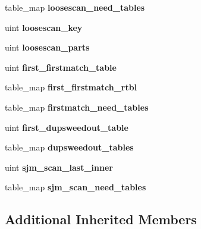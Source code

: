 \begin{DoxyCompactItemize}
\mbox{\label{structst__position_a8cd3ebf9fc563bfac1983f97a97bc81f}} 
table\+\_\+map {\bfseries loosescan\+\_\+need\+\_\+tables}
\item 
\mbox{\label{structst__position_a0f7959094b0551189f17496b4318dfad}} 
uint {\bfseries loosescan\+\_\+key}
\item 
\mbox{\label{structst__position_ac53c4c03bf2a7962e65bcfd0c1d549db}} 
uint {\bfseries loosescan\+\_\+parts}
\item 
\mbox{\label{structst__position_aa2143e25acde96767b338afe1b71f665}} 
uint {\bfseries first\+\_\+firstmatch\+\_\+table}
\item 
\mbox{\label{structst__position_a2250a6e56fb9822a536464bca7120009}} 
table\+\_\+map {\bfseries first\+\_\+firstmatch\+\_\+rtbl}
\item 
\mbox{\label{structst__position_aa2e6ad52f286351f2d69b0d1fbe617a9}} 
table\+\_\+map {\bfseries firstmatch\+\_\+need\+\_\+tables}
\item 
\mbox{\label{structst__position_a6b28c9f1b98b4338553fcb9fa9edffd3}} 
uint {\bfseries first\+\_\+dupsweedout\+\_\+table}
\item 
\mbox{\label{structst__position_a8a23435c5b2e6092c2a76d9b1f663746}} 
table\+\_\+map {\bfseries dupsweedout\+\_\+tables}
\item 
\mbox{\label{structst__position_a49de59eed736027891007e7ff05dea00}} 
uint {\bfseries sjm\+\_\+scan\+\_\+last\+\_\+inner}
\item 
\mbox{\label{structst__position_a10ccfdf00818485fa9230b73c827a6d6}} 
table\+\_\+map {\bfseries sjm\+\_\+scan\+\_\+need\+\_\+tables}
\end{DoxyCompactItemize}
\subsection*{Additional Inherited Members}


